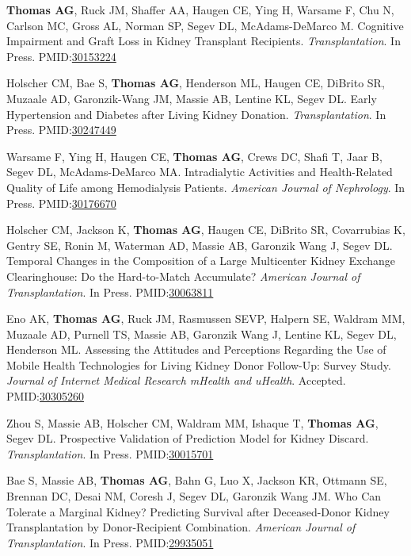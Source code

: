\documentclass[10pt]{article}
\makeatletter
\newlength{\bibhang}
\newlength{\bibsep}
 {\@listi \global\bibsep\itemsep \global\advance\bibsep by\parsep}
\newenvironment{bibenum*}
  {\renewcommand\labelenumi{[\theenumi]}%
   \etaremune[
     topsep=0pt,
     itemsep=\bibsep,
     parsep=0pt,partopsep=0pt,
     itemindent=-\bibhang,
     leftmargin={\bibhang+\widthof{[999]}}]}
  {\endetaremune}
\newcommand{\pmid}[1]{PMID:\href{https://www.ncbi.nlm.nih.gov/pubmed/#1}{#1}}
\makeatother
\begin{document}
\begin{bibenum*}
\item \textbf{Thomas AG\dag}, Ruck JM\dag, Shaffer AA, Haugen CE, Ying H,
  Warsame F, Chu N, Carlson MC, Gross AL,
  Norman SP, Segev DL, McAdams-DeMarco M.
  Cognitive Impairment and Graft Loss in Kidney Transplant Recipients.
  \emph{Transplantation}. In Press.
  \pmid{30153224} 

\item Holscher CM, Bae S, \textbf{Thomas AG}, Henderson ML, Haugen CE,
  DiBrito SR, Muzaale AD, Garonzik-Wang JM, Massie AB, Lentine KL, Segev DL.
  Early Hypertension and Diabetes after Living Kidney Donation.
  \emph{Transplantation}. In Press.
  \pmid{30247449} 

\item Warsame F, Ying H, Haugen CE, \textbf{Thomas AG}, Crews DC, Shafi T,
  Jaar B, Segev DL, McAdams-DeMarco MA. Intradialytic Activities and
  Health-Related Quality of Life among Hemodialysis Patients.
  \emph{American Journal of Nephrology}. In Press.
  \pmid{30176670} 

\item Holscher CM, Jackson K, \textbf{Thomas AG}, Haugen CE, DiBrito SR,
  Covarrubias K, Gentry SE, Ronin M, Waterman AD, Massie AB,
  Garonzik Wang J, Segev DL.
  Temporal Changes in the Composition of a Large Multicenter Kidney
  Exchange Clearinghouse: Do the Hard-to-Match Accumulate?
  \emph{American Journal of Transplantation}. In Press.
  \pmid{30063811} 

\item Eno AK, \textbf{Thomas AG}, Ruck JM, Rasmussen SEVP,
  Halpern SE, Waldram MM, Muzaale AD, Purnell TS, Massie AB,
  Garonzik Wang J, Lentine KL, Segev DL, Henderson ML.
  Assessing the Attitudes and Perceptions Regarding the Use of Mobile Health Technologies for Living Kidney Donor Follow-Up: Survey Study.
  \emph{Journal of Internet Medical Research mHealth and uHealth}.
  Accepted.
  \pmid{30305260} 

\item Zhou S, Massie AB, Holscher CM, Waldram MM, Ishaque T,
  \textbf{Thomas AG}, Segev DL. Prospective Validation of Prediction
  Model for Kidney Discard.
  \emph{Transplantation}. In Press.
  \pmid{30015701} 

\item Bae S, Massie AB, \textbf{Thomas AG}, Bahn G, Luo X, Jackson KR,
  Ottmann SE, Brennan DC, Desai NM, Coresh J, Segev DL, Garonzik Wang JM.
  Who Can Tolerate a Marginal Kidney? Predicting Survival after
  Deceased-Donor Kidney Transplantation by Donor-Recipient Combination.
  \emph{American Journal of Transplantation}. In Press.
  \pmid{29935051} 


\end{bibenum*}
\end{document}
